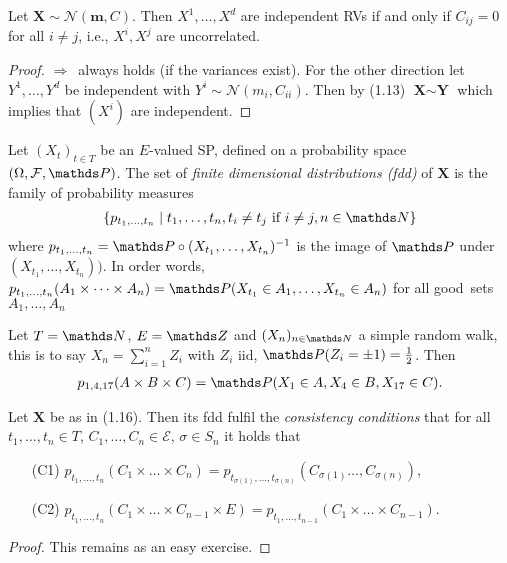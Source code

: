 \begin{prop}
Let $\textbf{X}\sim \mathcal{N}(\textbf{m},C)$.
Then $X^1,\dots,X^d$ are independent RVs if and only if $C_{ij}=0$ for all $i\not = j$, i.e., $X^i,X^j$ are uncorrelated.
\begin{proof}
\glqq $\Rightarrow$\grqq\, always holds (if the variances exist).
For the other direction let $Y^1,\dots,Y^d$ be independent with $Y^i\sim \mathcal{N}(m_i,C_{ii})$.
Then by (1.13) $\textbf{X} \sim \textbf{Y}$ which implies that $(X^i)$ are independent.
\end{proof}
\end{prop}

\begin{defi}
Let $(X_t)_{t \in T}$ be an $E$-valued SP, defined on a probability space $(\Omega,\mathcal{F},\Prob)$. The set of \emph{finite dimensional distributions (fdd)} of $\textbf{X}$ is the family of probability measures
\begin{align*}
\{p_{t_1,\dots,t_n}\mid t_1,\dots,t_n, t_i\not =t_j \text{ if } i \not = j,n\in \N\}
\end{align*}
where $p_{t_1,\dots,t_n}=\Prob \circ (X_{t_1},\dots,X_{t_n})^{-1}$ is the image of $\Prob$ under $(X_{t_1},\dots,X_{t_n}))$.
In order words, $p_{t_1,\dots,t_n}(A_1\times \dots \times A_n)=\Prob(X_{t_1}\in A_1,\dots,X_{t_n}\in A_n)$ for all \glqq good\grqq\, sets $A_1,\dots,A_n$
\end{defi}

\begin{bsp}
Let $T=\N$, $E=\Z$ and $(X_n)_{n\in \N}$ a simple random walk, this is to say
$X_n=\sum_{i=1}^n Z_i$ with $Z_i$ iid, $\Prob(Z_i=\pm 1)=\frac{1}{2}$.
Then
\begin{align*}
p_{1,4,17}(A\times B\times C)=\Prob(X_1\in A,X_4\in B,X_{17}\in C).
\end{align*}
\end{bsp}

\begin{prop}
Let $\textbf{X}$ be as in (1.16). Then its fdd fulfil the \emph{consistency conditions} that for all $t_1,\dots,t_n \in T$, $C_1,\dots,C_n \in \mathcal{E}$, $\sigma\in S_n$ it holds that
\begin{enumerate}
\item[(C1)] $p_{t_1,\dots ,t_n}(C_1\times \dots \times C_n)=p_{t_{\sigma(1)},\dots ,t_{\sigma(n)}}(C_{\sigma(1)}\dots ,C_{\sigma(n)})$,
\item[(C2)] $p_{t_1,\dots , t_n}(C_1\times \dots \times C_{n-1}\times E)=p_{t_1,\dots ,t_{n-1}}(C_1\times \dots \times C_{n-1})$.
\end{enumerate}
\begin{proof}
This remains as an easy exercise.
\end{proof}
\end{prop}

